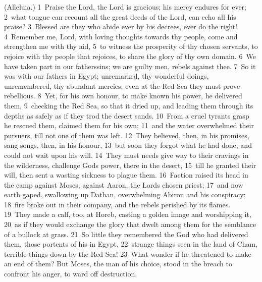 \documentclass[10pt]{book} %
\begin{document}
(Alleluia.)
\textcolor{benred8}{1}~Praise the Lord, the Lord is gracious; his mercy endures for ever; \textcolor{benred8}{2}~what tongue can recount all the great deeds of the Lord, can echo all his praise? \textcolor{benred8}{3}~Blessed are they who abide ever by his decrees, ever do the right! \textcolor{benred8}{4}~Remember me, Lord, with loving thoughts towards thy people, come and strengthen me with thy aid, \textcolor{benred8}{5}~to witness the prosperity of thy chosen servants, to rejoice with thy people that rejoices, to share the glory of thy own domain.
\textcolor{benred8}{6}~We have taken part in our fathers\textquotesingle  sins; we are guilty men, rebels against thee. \textcolor{benred8}{7}~So it was with our fathers in Egypt; unremarked, thy wonderful doings, unremembered, thy abundant mercies; even at the Red Sea they must prove rebellious. \textcolor{benred8}{8}~Yet, for his own honour, to make known his power, he delivered them, \textcolor{benred8}{9}~checking the Red Sea, so that it dried up, and leading them through its depths as safely as if they trod the desert sands. \textcolor{benred8}{10}~From a cruel tyrant\textquotesingle s grasp he rescued them, claimed them for his own; \textcolor{benred8}{11}~and the water overwhelmed their pursuers, till not one of them was left. \textcolor{benred8}{12}~They believed, then, in his promises, sang songs, then, in his honour, \textcolor{benred8}{13}~but soon they forgot what he had done, and could not wait upon his will. \textcolor{benred8}{14}~They must needs give way to their cravings in the wilderness, challenge God\textquotesingle s power, there in the desert, \textcolor{benred8}{15}~till he granted their will, then sent a wasting sickness to plague them. \textcolor{benred8}{16}~Faction raised its head in the camp against Moses, against Aaron, the Lord\textquotesingle s chosen priest; \textcolor{benred8}{17}~and now earth gaped, swallowing up Dathan, overwhelming Abiron and his conspiracy; \textcolor{benred8}{18}~fire broke out in their company, and the rebels perished by its flames. \textcolor{benred8}{19}~They made a calf, too, at Horeb, casting a golden image and worshipping it, \textcolor{benred8}{20}~as if they would exchange the glory that dwelt among them for the semblance of a bullock at grass. \textcolor{benred8}{21}~So little they remembered the God who had delivered them, those portents of his in Egypt, \textcolor{benred8}{22}~strange things seen in the land of Cham, terrible things down by the Red Sea! \textcolor{benred8}{23}~What wonder if he threatened to make an end of them? But Moses, the man of his choice, stood in the breach to confront his anger, to ward off destruction.
\end{document}
